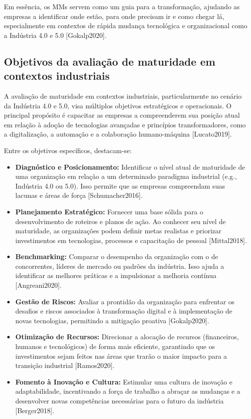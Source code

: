 Em essência, os MMs servem como um guia para a transformação, ajudando as empresas a identificar onde estão, para onde precisam ir e como chegar lá, especialmente em contextos de rápida mudança tecnológica e organizacional como a Indústria 4.0 e 5.0 [Gokalp2020].

\subsection{Objetivos da avaliação de maturidade em contextos industriais}

A avaliação de maturidade em contextos industriais, particularmente no cenário da Indústria 4.0 e 5.0, visa múltiplos objetivos estratégicos e operacionais. O principal propósito é capacitar as empresas a compreenderem sua posição atual em relação à adoção de tecnologias avançadas e princípios transformadores, como a digitalização, a automação e a colaboração humano-máquina [Lucato2019].

Entre os objetivos específicos, destacam-se:
\begin{itemize}
    \item \textbf{Diagnóstico e Posicionamento:} Identificar o nível atual de maturidade de uma organização em relação a um determinado paradigma industrial (e.g., Indústria 4.0 ou 5.0). Isso permite que as empresas compreendam suas lacunas e áreas de força [Schumacher2016].
    \item \textbf{Planejamento Estratégico:} Fornecer uma base sólida para o desenvolvimento de roteiros e planos de ação. Ao conhecer seu nível de maturidade, as organizações podem definir metas realistas e priorizar investimentos em tecnologias, processos e capacitação de pessoal [Mittal2018].
    \item \textbf{Benchmarking:} Comparar o desempenho da organização com o de concorrentes, líderes de mercado ou padrões da indústria. Isso ajuda a identificar as melhores práticas e a impulsionar a melhoria contínua [Angreani2020].
    \item \textbf{Gestão de Riscos:} Avaliar a prontidão da organização para enfrentar os desafios e riscos associados à transformação digital e à implementação de novas tecnologias, permitindo a mitigação proativa [Gokalp2020].
    \item \textbf{Otimização de Recursos:} Direcionar a alocação de recursos (financeiros, humanos e tecnológicos) de forma mais eficiente, garantindo que os investimentos sejam feitos nas áreas que trarão o maior impacto para a transição industrial [Ramos2020].
    \item \textbf{Fomento à Inovação e Cultura:} Estimular uma cultura de inovação e adaptabilidade, incentivando a força de trabalho a abraçar as mudanças e a desenvolver novas competências necessárias para o futuro da indústria [Berger2018].
\end{itemize}

